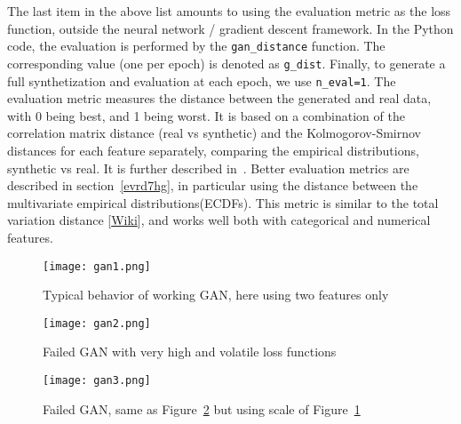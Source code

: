 \documentclass[oneside,10pt]{book}
\begin{document}
\noindent The last item in the above list amounts to using the evaluation metric as the loss function, outside the neural network /
\textcolor{index}{gradient descent} framework. In the Python code,
 the evaluation is performed by the  \texttt{gan\_distance} function. The corresponding value (one per epoch) is denoted
 as \texttt{g\_dist}. Finally, to generate a full synthetization and evaluation at each epoch, we use \texttt{n\_eval=1}. The evaluation
 metric measures the distance between the generated and real data, with 0 being best, and 1 being worst. It is based
 on a combination of the \textcolor{index}{correlation matrix distance} (real vs synthetic) and the
\textcolor{index}{Kolmogorov-Smirnov distances} for each feature separately, comparing
 the \textcolor{index}{empirical distributions}, synthetic vs real. It is further described in~\cite{vgvendors}.
 Better evaluation metrics are described in section~\ref{evrd7hg}, in particular using the distance between the multivariate empirical distributions(ECDFs).
This metric is similar to the \textcolor{index}{total variation distance} [\href{https://en.wikipedia.org/wiki/Total_variation_distance_of_probability_measures}{Wiki}], and works well both with categorical and numerical features.

\begin{figure}[H]
\centering
\texttt{[image: gan1.png]} %
\caption{Typical behavior of working GAN, here using two features only}
\label{fig:nog29j}
\end{figure}



\begin{figure}[H]
\centering
\texttt{[image: gan2.png]} %
\caption{Failed GAN with very high and volatile loss functions}
\label{fig:nog29jfg}
\end{figure}

\begin{figure}[H]
\centering
\texttt{[image: gan3.png]} %
\caption{Failed GAN, same as Figure~\ref{fig:nog29jfg} but using scale of Figure~\ref{fig:nog29j}}
\label{fig:nog29jq8}
\end{figure}
\end{document}
